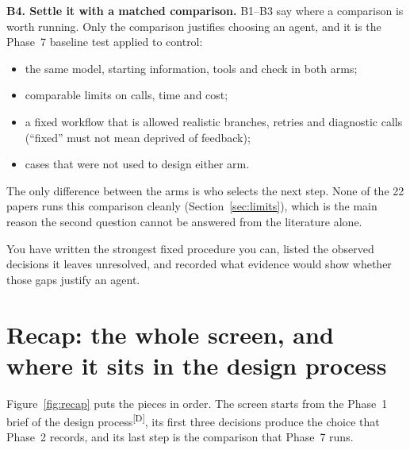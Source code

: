 \documentclass[10pt]{article}
\newcommand{\p}[1]{\textsuperscript{[#1]}}
\begin{document}
\textbf{B4. Settle it with a matched comparison.}
B1--B3 say where a comparison is worth running.
Only the comparison justifies choosing an agent, and it is the Phase~7 baseline test applied to control:
\begin{itemize}
\item the same model, starting information, tools and check in both arms;
\item comparable limits on calls, time and cost;
\item a fixed workflow that is allowed realistic branches, retries and diagnostic calls (``fixed'' must not mean deprived of feedback);
\item cases that were not used to design either arm.
\end{itemize}
The only difference between the arms is who selects the next step.
None of the 22 papers runs this comparison cleanly (Section~\ref{sec:limits}), which is the main reason the second question cannot be answered from the literature alone.

\begin{gate}
You have written the strongest fixed procedure you can, listed the observed decisions it leaves unresolved, and recorded what evidence would show whether those gaps justify an agent.
\end{gate}

\section{Recap: the whole screen, and where it sits in the design process}\label{sec:recap}

Figure~\ref{fig:recap} puts the pieces in order. The screen starts from the Phase~1 brief of the design process\p{D}, its first three decisions produce the choice that Phase~2 records, and its last step is the comparison that Phase~7 runs.
\end{document}
